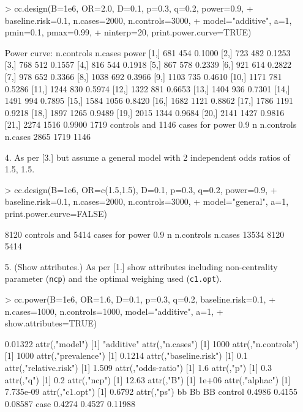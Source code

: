 \documentclass[a4paper,10pt]{amsart}
\begin{document}
\begin{itemize}
\begin{Schunk}
\begin{Sinput}
> cc.design(B=1e6, OR=2.0, D=0.1, p=0.3, q=0.2, power=0.9, 
+           baseline.risk=0.1, n.cases=2000, n.controls=3000, 
+           model="additive", a=1, pmin=0.1, pmax=0.99, 
+           ninterp=20, print.power.curve=TRUE)
\end{Sinput}
\begin{Soutput}
Power curve:
      n.controls n.cases  power
 [1,]        681     454 0.1000
 [2,]        723     482 0.1253
 [3,]        768     512 0.1557
 [4,]        816     544 0.1918
 [5,]        867     578 0.2339
 [6,]        921     614 0.2822
 [7,]        978     652 0.3366
 [8,]       1038     692 0.3966
 [9,]       1103     735 0.4610
[10,]       1171     781 0.5286
[11,]       1244     830 0.5974
[12,]       1322     881 0.6653
[13,]       1404     936 0.7301
[14,]       1491     994 0.7895
[15,]       1584    1056 0.8420
[16,]       1682    1121 0.8862
[17,]       1786    1191 0.9218
[18,]       1897    1265 0.9489
[19,]       2015    1344 0.9684
[20,]       2141    1427 0.9816
[21,]       2274    1516 0.9900
1719 controls and 1146 cases for power 0.9 
         n n.controls    n.cases 
      2865       1719       1146 
\end{Soutput}
\end{Schunk}
\item[4.] As per [3.] but assume a general model with 2 independent odds ratios
of 1.5, 1.5.
\begin{Schunk}
\begin{Sinput}
> cc.design(B=1e6, OR=c(1.5,1.5), D=0.1, p=0.3, q=0.2, power=0.9, 
+           baseline.risk=0.1, n.cases=2000, n.controls=3000, 
+           model="general", a=1, print.power.curve=FALSE)
\end{Sinput}
\begin{Soutput}
8120 controls and 5414 cases for power 0.9 
         n n.controls    n.cases 
     13534       8120       5414 
\end{Soutput}
\end{Schunk}
\item[5.] (Show attributes.) As per [1.] show attributes
including non-centrality parameter (\texttt{ncp}) and the optimal
weighing used (\texttt{c1.opt}).
\begin{Schunk}
\begin{Sinput}
> cc.power(B=1e6, OR=1.6, D=0.1, p=0.3, q=0.2, baseline.risk=0.1, 
+          n.cases=1000, n.controls=1000, model="additive", a=1,
+          show.attributes=TRUE)
\end{Sinput}
\begin{Soutput}
[1] 0.01322
attr(,"model")
[1] "additive"
attr(,"n.cases")
[1] 1000
attr(,"n.controls")
[1] 1000
attr(,"prevalence")
[1] 0.1214
attr(,"baseline.risk")
[1] 0.1
attr(,"relative.risk")
[1] 1.509
attr(,"odds-ratio")
[1] 1.6
attr(,"p")
[1] 0.3
attr(,"q")
[1] 0.2
attr(,"ncp")
[1] 12.63
attr(,"B")
[1] 1e+06
attr(,"alphac")
[1] 7.735e-09
attr(,"c1.opt")
[1] 0.6792
attr(,"ps")
            bb     Bb      BB
control 0.4986 0.4155 0.08587
case    0.4274 0.4527 0.11988
\end{Soutput}
\end{Schunk}


\end{itemize}
\end{document}
